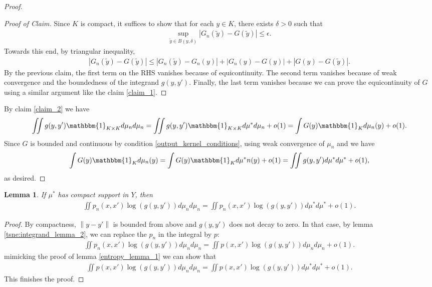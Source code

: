 \documentclass[10pt]{article}
\newcommand{\norm}[1]{\left\lVert#1\right\rVert}
\newtheorem{lemma}{\bf Lemma}
\newenvironment{Proof of lemma}{\noindent{\bf Proof of Lemma}}{\hfill$\Box$\newline}
\newenvironment{Proof of claim}{\noindent{\bf Proof of claim}}{\hfill$\Box$\newline}
\newenvironment{Proof of theorem}{\noindent{\bf Proof of Theorem}}{\hfill\scriptsize{$\Box$}\newline}
\newenvironment{Proof of theorems}{\noindent{\bf Proof of Theorems}}{\hfill$\Box$\newline}
\newenvironment{Proof of proposition}{\noindent{\bf Proof of Proposition}}{\hfill$\Box$\newline}
\newenvironment{Proof of propositions}{\noindent{\bf Proof of Propositions}}{\hfill$\Box$\newline}
\newenvironment{Proof of exercise}{\noindent{\it Proof of Exercise:}}{\hfill$\Box$}
\numberwithin{equation}{section}
\begin{document}
\begin{proof}
    \begin{proof}[Proof of Claim]
        Since $K$ is compact, it suffices to show that for each $y \in K$, there exists $\delta>0$ such that
        \begin{align}
            \sup_{\tilde{y}\in B(y,\delta)} |G_n(\tilde{y})-G(\tilde{y})| \leq \epsilon.
        \end{align}
        Towards this end, by triangular inequality,
        \begin{align}
            |G_n(\tilde{y})-G(\tilde{y})| \leq |G_n(\tilde{y})-G_n(y)|+|G_n(y)-G(y)|+|G(y)-G(\tilde{y})|.
        \end{align}
        By the previous claim, the first term on the RHS vanishes because of equicontinuity. The second term vanishes because of weak convergence and the boundedness of the integrand $g(y,y')$. Finally, the last term vanishes because we can prove the equicontinuity of $G$ using a similar argument like the claim \ref{claim_1}.
    \end{proof}
    By claim \ref{claim_2} we have
    \begin{align}
        \iint g(y,y') \mathbbm{1}_{K \times K} d\mu_n d\mu_n = \iint g(y,y') \mathbbm{1}_{K \times K} d\mu^* d\mu_n +o(1) = \int G(y) \mathbbm{1}_K d\mu_n(y)+o(1).
    \end{align}
    Since $G$ is bounded and continuous by condition \ref{output_kernel_conditions}, using weak convergence of $\mu_n$ and we have
    \begin{align}
        \int G(y) \mathbbm{1}_K d\mu_n(y) = \int G(y) \mathbbm{1}_K d\mu^*n(y) + o(1) = \iint g(y,y')d\mu^* d\mu^* + o(1),
    \end{align}
    as desired.
\end{proof}
\begin{lemma}
    If $\mu^*$ has compact support in $Y$, then
    \begin{align}
        \iint p_n(x,x') \log(g(y,y')) d\mu_n d\mu_n = \iint p_n(x,x') \log(g(y,y')) d\mu^* d\mu^* +o(1).
    \end{align}
\end{lemma}
\begin{proof}
    By compactness, $\norm{y-y'}$ is bounded from above and $g(y,y')$ does not decay to zero. In that case, by lemma \ref{tsne:integrand_lemma_2}, we can replace the $p_n$ in the integral by $p$:
    \begin{align}
        \iint p_n(x,x') \log(g(y,y')) d\mu_n d\mu_n = \iint p(x,x') \log(g(y,y')) d\mu_n d\mu_n + o(1).
    \end{align}
    mimicking the proof of lemma \ref{entropy_lemma_1} we can show that
    \begin{align}
        \iint p(x,x') \log(g(y,y')) d\mu_n d\mu_n = \iint p(x,x') \log(g(y,y')) d\mu^* d\mu^* + o(1).
    \end{align}
    This finishes the proof.
\end{proof}
\end{document}
